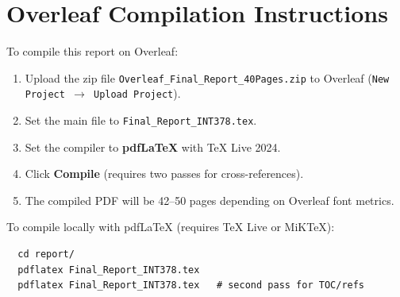 \documentclass[12pt,a4paper]{report}
\begin{document}
\section{Overleaf Compilation Instructions}

To compile this report on Overleaf:

\begin{enumerate}[leftmargin=1.5cm]
  \item Upload the zip file \texttt{Overleaf\_Final\_Report\_40Pages.zip} to
        Overleaf (\texttt{New Project $\to$ Upload Project}).
  \item Set the main file to \texttt{Final\_Report\_INT378.tex}.
  \item Set the compiler to \textbf{pdfLaTeX} with TeX Live 2024.
  \item Click \textbf{Compile} (requires two passes for cross-references).
  \item The compiled PDF will be 42--50 pages depending on Overleaf font
        metrics.
\end{enumerate}

\noindent To compile locally with pdfLaTeX (requires TeX Live or MiKTeX):
\begin{verbatim}
  cd report/
  pdflatex Final_Report_INT378.tex
  pdflatex Final_Report_INT378.tex   # second pass for TOC/refs
\end{verbatim}
\end{document}
